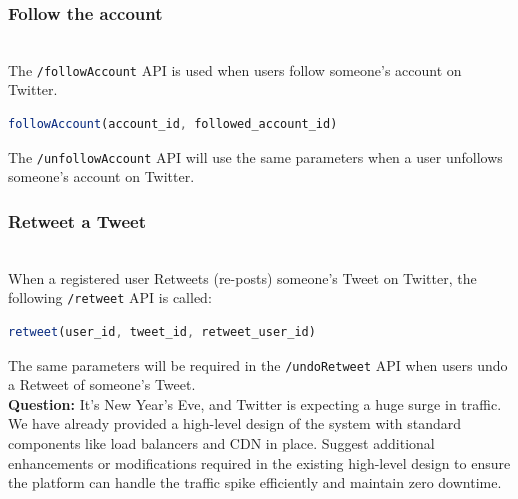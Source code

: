 \subsubsection{Follow the account}\label{iUcyFxPZiIsyufwJO7SQL}
\\
The \texttt{/followAccount} API is used when users follow someone's account on Twitter.

\begin{lstlisting}[language=JavaScript]
followAccount(account_id, followed_account_id)
\end{lstlisting}

\begin{table}[htbp]
\centering
\small
{}
\end{table}

The \texttt{/unfollowAccount} API will use the same parameters when a user unfollows someone's account on Twitter.

\subsubsection{Retweet a Tweet}\label{Zd0FdlFPA04LNlqpa3HeT}
\\
When a registered user Retweets (re-posts) someone's Tweet on Twitter, the following \texttt{/retweet} API is called:

\begin{lstlisting}[language=JavaScript]
retweet(user_id, tweet_id, retweet_user_id)
\end{lstlisting}

The same parameters will be required in the \texttt{/undoRetweet} API when users undo a Retweet of someone's Tweet.
\\
\textbf{Question:} It's New Year's Eve, and Twitter is expecting a huge surge in traffic. We have already provided a high-level design of the system with standard components like load balancers and CDN in place. Suggest additional enhancements or modifications required in the existing high-level design to ensure the platform can handle the traffic spike efficiently and maintain zero downtime.\\
\\


